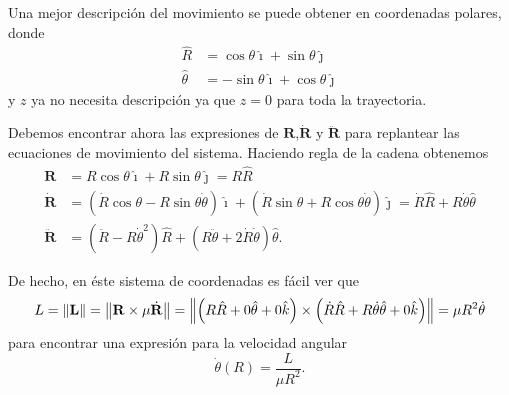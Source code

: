 Una mejor descripción del movimiento se puede obtener en coordenadas polares, donde
\begin{align}
 \hat{R} &= \cos \theta \hat{\imath} + \sin \theta \hat{\jmath} \nonumber \\
 \hat{\theta} &= -\sin \theta \hat{\imath} + \cos \theta \hat{\jmath}
 \label{eq:polar_transformation}
\end{align}
y $z$ ya no necesita descripción ya que $z=0$ para toda la trayectoria. 

Debemos encontrar ahora las expresiones de $\mathbf{R}$,$\dot{\mathbf{R}}$ y $\ddot{\mathbf{R}}$ para replantear las ecuaciones de movimiento del sistema. Haciendo regla de la cadena obtenemos
\begin{align}
 \mathbf{R} &= R \cos \theta \hat{\imath} + R \sin \theta \hat{\jmath} = R \hat{R} \\
 \dot{\mathbf{R}} &= \left( \dot{R} \cos \theta - R \sin \theta \dot{\theta} \right) \hat{\imath} + \left( \dot{R} \sin \theta + R \cos \theta \dot{\theta} \right) \hat{\jmath} = \dot{R}\hat{R} + R \dot{\theta} \hat{\theta} \\
 \ddot{\mathbf{R}} &= \left(\ddot{R} - R \dot{\theta}^2 \right) \hat{R} + \left( R \ddot{\theta} + 2 \dot{R}\dot{\theta} \right) \hat{\theta}.
 \label{eq:motion_polar_variables}
\end{align}

De hecho, en éste sistema de coordenadas es fácil ver que
\begin{equation}
 L = \left\lVert \mathbf{L} \right\rVert = \left\lVert \mathbf{R} \times \mu \dot{\mathbf{R}} \right\rVert = \left\lVert \left( R \hat{R} + 0 \hat{\theta} + 0 \hat{k} \right) \times \left( \dot{R} \hat{R} + R \dot{\theta} \hat{\theta} + 0\hat{k} \right) \right\rVert = \mu R^2 \dot{\theta}
\end{equation}
para encontrar una expresión para la velocidad angular 
\begin{equation}
\dot{\theta}(R) = \frac{L}{\mu R^2}.
\label{eq:2body_ang_vel}
\end{equation}

